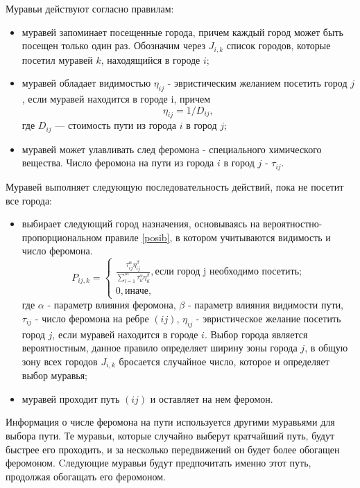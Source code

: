 Муравьи действуют согласно правилам:
\begin{itemize}
	\item муравей запоминает посещенные города, причем каждый город может быть посещен только один раз. Обозначим через $J_{i,k}$ список городов, которые посетил муравей $k$, находящийся в городе $i$;
	\item муравей обладает видимостью $\eta_{ij}$ - эвристическим желанием посетить город $j$, если муравей находится в городе i, причем
\begin{equation}
	\label{d_func}
	\eta_{ij} = 1 / D_{ij},
\end{equation}
где $D_{ij}$ — стоимость пути из города $i$ в город $j$;
	\item муравей может улавливать след феромона - специального химического вещества. Число феромона на пути из города $i$ в город $j$ - $\tau_{ij}$.
\end{itemize}

Муравей выполняет следующую последовательность действий, пока не посетит все города:
\begin{itemize}
	\item выбирает следующий город назначения, основываясь на вероятностно-пропорциональном правиле \eqref{posib}, в котором учитываются видимость и число феромона.
\begin{equation}
	\label{posib}
	P_{ij, k} = \begin{cases}
		\frac{\tau_{ij}^\alpha\eta_{ij}^\beta}{\sum_{l=1}^m \tau^\alpha_{il}\eta^\beta_{il}}, \textrm{если город j необходимо посетить;} \\
		0, \textrm{иначе,}
	\end{cases}
\end{equation}
где $\alpha$ - параметр влияния феромона, $\beta$ - параметр влияния видимости пути, $\tau_{ij}$ - число феромона на ребре $(ij)$, $\eta_{ij}$ - эвристическое желание посетить город $j$, если муравей находится в городе $i$. Выбор города является вероятностным, данное правило определяет ширину зоны города $j$, в общую зону всех городов $J_{i,k}$ бросается случайное число, которое и определяет выбор муравья;
	\item муравей проходит путь $(ij)$ и оставляет на нем феромон.
\end{itemize}

Информация о числе феромона на пути используется другими муравьями для выбора пути. Те муравьи, которые случайно выберут кратчайший путь, будут быстрее его проходить, и за несколько передвижений он будет более обогащен феромоном. Cледующие муравьи будут предпочитать именно этот путь, продолжая обогащать его феромоном. 

